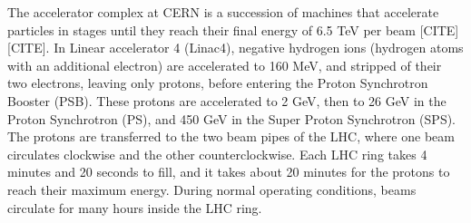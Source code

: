 The accelerator complex at CERN is a succession of machines that accelerate particles in stages until they reach their final energy of 6.5 TeV per beam [CITE] [CITE]. In Linear accelerator 4 (Linac4), negative hydrogen ions (hydrogen atoms with an additional electron) are accelerated to 160 MeV, and stripped of their two electrons, leaving only protons, before entering the Proton Synchrotron Booster (PSB). These protons are accelerated to 2 GeV, then to 26 GeV in the Proton Synchrotron (PS), and 450 GeV in the Super Proton Synchrotron (SPS). The protons are transferred to the two beam pipes of the LHC, where one beam circulates clockwise and the other counterclockwise. Each LHC ring takes 4 minutes and 20 seconds to fill, and it takes about 20 minutes for the protons to reach their maximum energy. During normal operating conditions, beams circulate for many hours inside the LHC ring.


